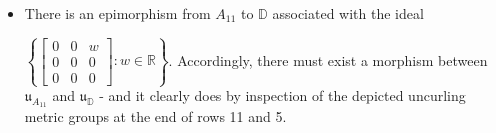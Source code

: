 \documentclass{amsart}
\numberwithin{equation}{section}
\theoremstyle{definition}
\numberwithin{theorem}{section}
\begin{document}
\begin{itemize}
 $\left\{\left[\begin{array}{ccc}
0  & 0 & w   \\
 0 & 0 & v \\
 0 & 0 & 0    
\end{array}\right]:w,v\in\mathbb{R}\right\}$.
The functor then implies that there must exist a morphism from $\mathfrak{u}_{A_{12}}$ to $\mathfrak{u}_{\mathbb{D}}$.  Indeed, existence of the latter morphism is obvious from the last entries in rows 12 and 5 of Table I. 
\item There is an epimorphism from $A_{11}$ to $\mathbb{D}$ associated with the ideal 

 $ \left\{\left[\begin{array}{ccc}
0  & 0 & w   \\
 0 & 0 & 0 \\
 0 & 0 & 0    
\end{array}\right]:w\in\mathbb{R} \right\} $. Accordingly, there must exist a morphism between $\mathfrak{u}_{A_{11}}$ and $\mathfrak{u}_{\mathbb{D}}$  - and it clearly does by inspection of the depicted uncurling metric groups at the end of rows 11 and 5.  
\end{itemize}
\end{document}

